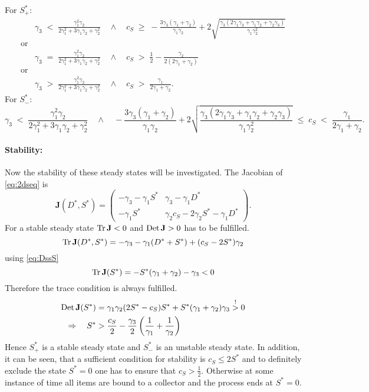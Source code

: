 For $S^*_+$:
%
\begin{align*}
 &\gamma_3 \;<\; \frac{\gamma_1^2\gamma_2}{2\gamma_1^2+3\gamma_1\gamma_2+\gamma_2^2} \quad\wedge\quad c_S\;\geq\;-\frac{3\gamma_3(\gamma_1+\gamma_2)}{\gamma_1\gamma_2}+2\sqrt{\frac{\gamma_3(2\gamma_1\gamma_3+\gamma_1\gamma_2+\gamma_2\gamma_3)}{\gamma_1\gamma_2^2}}\\
 \mbox{or} & \\
&\gamma_3\;=\;\frac{\gamma_1^2\gamma_2}{2\gamma_1^2+3\gamma_1\gamma_2+\gamma_2^2} \quad\wedge\quad c_S \;>\; \frac{1}{2}-\frac{\gamma_2}{2(2\gamma_1+\gamma_2)}\\
 \mbox{or} & \\
&\gamma_3 \;>\;\frac{\gamma_1^2\gamma_2}{2\gamma_1^2+3\gamma_1\gamma_2+\gamma_2^2} \quad\wedge\quad c_S \;>\; \frac{\gamma_1}{2\gamma_1+\gamma_2}. 
\end{align*}
%
For $S^*_-$:
%
\begin{equation*}
 \gamma_3 \;<\; \frac{\gamma_1^2\gamma_2}{2\gamma_1^2+3\gamma_1\gamma_2+\gamma_2^2}\quad \wedge \quad -\frac{3\gamma_3(\gamma_1+\gamma_2)}{\gamma_1\gamma_2}+2\sqrt{\frac{\gamma_3(2\gamma_1\gamma_3+\gamma_1\gamma_2+\gamma_2\gamma_3)}{\gamma_1\gamma_2^2}}\;\leq\;c_S\;<\;\frac{\gamma_1}{2\gamma_1+\gamma_2}.
\end{equation*}
%
\paragraph{Stability:}

Now the stability of these steady states will be investigated. The Jacobian of \eqref{eq:2dseq} is
%
\begin{equation*}
 \mathbf{J}(D^*,S^*) = 
 \begin{pmatrix}
  -\gamma_3-\gamma_1 S^* & \gamma_3-\gamma_1 D^*\\ 
  -\gamma_1 S^* &  \gamma_2 c_S -2\gamma_2 S^*-\gamma_1 D^*
 \end{pmatrix}.
\end{equation*}
%
For a stable steady state $\operatorname{Tr} \mathbf{J} < 0$ and $\operatorname{Det} \mathbf{J} > 0$ has to be fulfilled.
%
\begin{equation*}
	\operatorname{Tr} \mathbf{J}(D^*,S^*) = -\gamma_3-\gamma_1(D^*+S^*)+(c_S-2S^*)\gamma_2
\end{equation*}
%
using \eqref{eq:DssS}
%
\begin{equation*}
\operatorname{Tr} \mathbf{J}(S^*) = -S^*(\gamma_1+\gamma_2)-\gamma_3 < 0
\end{equation*}
%
Therefore the trace condition is always fulfilled. 
%
\begin{align}
\nonumber \operatorname{Det} \mathbf{J}(S^*) &= \gamma_1\gamma_2(2 S^*-c_S)S^*+S^*(\gamma_1+\gamma_2)\gamma_3 \overset{!}{>} 0\\
\Rightarrow \quad S^* &> \frac{c_S}{2}-\frac{\gamma_3}{2}\left(\frac{1}{\gamma_1}+\frac{1}{\gamma_2}\right)
\end{align}
%
Hence $S^*_+$ is a stable steady state and $S^*_-$ is an unstable steady state.
In addition, it can be seen, that a sufficient condition for stability is $c_S\leq 2 S^*$ and to definitely exclude the state $S^*=0$ one has to ensure that $c_S > \frac{1}{2}$. Otherwise at some instance of time all items are bound to a collector and the process ends at $S^*=0$. 

